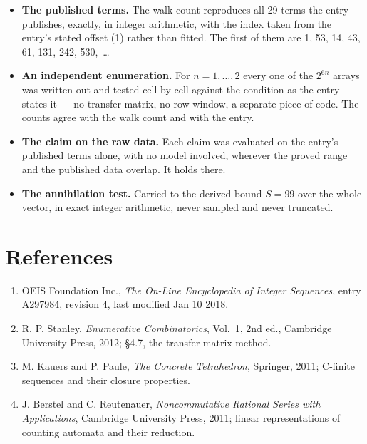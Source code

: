\documentclass[11pt]{article}
\theoremstyle{definition}
\begin{document}
\begin{itemize}

\item {\bfseries The published terms.} The walk count reproduces all 29 terms the entry publishes, exactly, in integer arithmetic, with the index taken from the entry's stated offset (1) rather than fitted. The first of them are 1, 53, 14, 43, 61, 131, 242, 530,~\dots

\item {\bfseries An independent enumeration.} For $n = 1,\dots,2$ every one of the $2^{6n}$ arrays was written out and tested cell by cell against the condition as the entry states it --- no transfer matrix, no row window, a separate piece of code. The counts agree with the walk count and with the entry.

\item {\bfseries The claim on the raw data.} Each claim was evaluated on the entry's published terms alone, with no model involved, wherever the proved range and the published data overlap. It holds there.

\item {\bfseries The annihilation test.} Carried to the derived bound $S = 99$ over the whole vector, in exact integer arithmetic, never sampled and never truncated.

\end{itemize}

\section{References}

\begin{enumerate}

\item OEIS Foundation Inc., \emph{The On-Line Encyclopedia of Integer Sequences}, entry \href{https://oeis.org/A297984}{A297984}, revision 4, last modified Jan 10 2018.

\item R. P. Stanley, \emph{Enumerative Combinatorics}, Vol.~1, 2nd ed., Cambridge University Press, 2012; \S4.7, the transfer-matrix method.

\item M. Kauers and P. Paule, \emph{The Concrete Tetrahedron}, Springer, 2011; C-finite sequences and their closure properties.

\item J. Berstel and C. Reutenauer, \emph{Noncommutative Rational Series with Applications}, Cambridge University Press, 2011; linear representations of counting automata and their reduction.

\end{enumerate}
\end{document}
